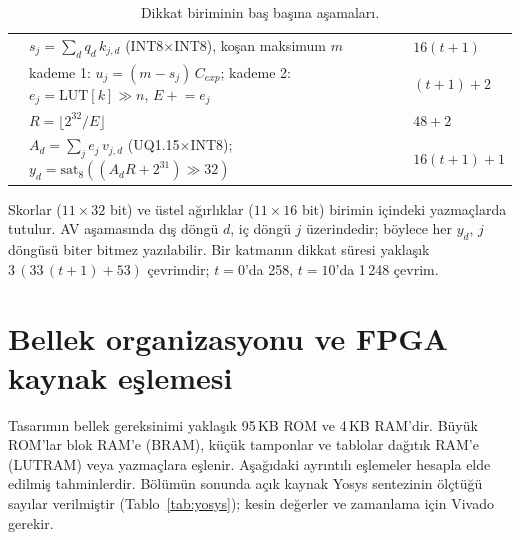 \begin{table}[h]
  \centering\small
  \caption{Dikkat biriminin baş başına aşamaları.}
  \label{tab:att}
  \begin{tabularx}{\textwidth}{@{}lLl@{}}
    \toprule
     &  &  \\ \midrule
     & $s_j = \sum_d q_d\, k_{j,d}$ (INT8$\times$INT8), koşan maksimum $m$ & $16(t+1)$ \\
     & kademe 1: $u_j = (m-s_j)\, C_{exp}$; kademe 2: $e_j = \mathrm{LUT}[k] \gg n$, $E \mathrel{+}= e_j$ & $(t+1)+2$ \\
     & $R = \lfloor 2^{32}/E \rfloor$ & $48+2$ \\
     & $A_d = \sum_j e_j\, v_{j,d}$ (UQ1.15$\times$INT8); $y_d = \mathrm{sat}_8((A_d R + 2^{31}) \gg 32)$ & $16(t+1)+1$ \\ \bottomrule
  \end{tabularx}
\end{table}

Skorlar ($11\times32$ bit) ve üstel ağırlıklar ($11\times16$ bit) birimin içindeki yazmaçlarda tutulur. AV aşamasında dış döngü $d$, iç döngü $j$ üzerindedir; böylece her $y_d$, $j$ döngüsü biter bitmez yazılabilir. Bir katmanın dikkat süresi yaklaşık $3\,(33\,(t+1) + 53)$ çevrimdir; $t=0$'da 258, $t=10$'da 1\,248 çevrim.

\section{Bellek organizasyonu ve FPGA kaynak eşlemesi}

Tasarımın bellek gereksinimi yaklaşık 95\,KB ROM ve 4\,KB RAM'dir. Büyük ROM'lar blok RAM'e (BRAM), küçük tamponlar ve tablolar dağıtık RAM'e (LUTRAM) veya yazmaçlara eşlenir. Aşağıdaki ayrıntılı eşlemeler hesapla elde edilmiş tahminlerdir. Bölümün sonunda açık kaynak Yosys sentezinin ölçtüğü sayılar verilmiştir (Tablo~\ref{tab:yosys}); kesin değerler ve zamanlama için Vivado gerekir.

